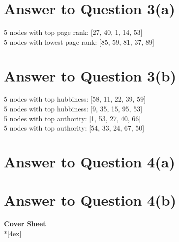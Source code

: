 \documentclass[11pt]{article}
\begin{document}
\pagebreak[4]
\section*{Answer to Question 3(a)}
5 nodes with top page rank: [27, 40, 1, 14, 53]\\
5 nodes with lowest page rank: [85, 59, 81, 37, 89]

\pagebreak[4]
\section*{Answer to Question 3(b)}
5 nodes with top hubbiness: [58, 11, 22, 39, 59]\\
5 nodes with top hubbiness: [9, 35, 15, 95, 53]\\
5 nodes with top authority: [1, 53, 27, 40, 66]\\
5 nodes with top authority: [54, 33, 24, 67, 50]

\pagebreak[4]
\section*{Answer to Question 4(a)}

\pagebreak[4]
\section*{Answer to Question 4(b)}

\pagebreak[4]
\begin{center}
\LARGE{\bf \textsf{Cover Sheet}} \\*[4ex]
\end{center}
\end{document}
